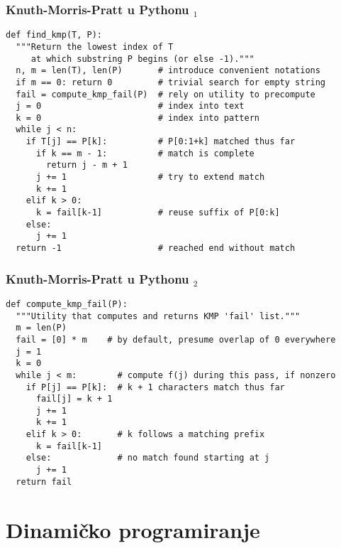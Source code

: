 \documentclass[compress,aspectratio=169]{beamer}
\begin{document}
\begin{frame}
  \frametitle{Knuth-Morris-Pratt u Pythonu $_1$}
\begin{verbatim}
def find_kmp(T, P):
  """Return the lowest index of T
     at which substring P begins (or else -1)."""
  n, m = len(T), len(P)       # introduce convenient notations
  if m == 0: return 0         # trivial search for empty string
  fail = compute_kmp_fail(P)  # rely on utility to precompute
  j = 0                       # index into text
  k = 0                       # index into pattern
  while j < n:
    if T[j] == P[k]:          # P[0:1+k] matched thus far
      if k == m - 1:          # match is complete
        return j - m + 1           
      j += 1                  # try to extend match
      k += 1
    elif k > 0:                    
      k = fail[k-1]           # reuse suffix of P[0:k]
    else:
      j += 1
  return -1                   # reached end without match
\end{verbatim}
\end{frame}

\begin{frame}[fragile,shrink=12]
  \frametitle{Knuth-Morris-Pratt u Pythonu $_2$}
\begin{verbatim}
def compute_kmp_fail(P):
  """Utility that computes and returns KMP 'fail' list."""
  m = len(P)
  fail = [0] * m    # by default, presume overlap of 0 everywhere
  j = 1
  k = 0
  while j < m:        # compute f(j) during this pass, if nonzero
    if P[j] == P[k]:  # k + 1 characters match thus far
      fail[j] = k + 1
      j += 1
      k += 1
    elif k > 0:       # k follows a matching prefix
      k = fail[k-1]
    else:             # no match found starting at j
      j += 1
  return fail
\end{verbatim}
\end{frame}

\section[Din prog]{Dinamičko programiranje}
\end{document}
